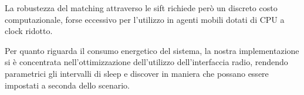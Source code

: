 La robustezza del matching attraverso le sift richiede per\`o un
discreto costo computazionale, forse eccessivo per l'utilizzo in
agenti mobili dotati di CPU a clock ridotto.

Per quanto riguarda il consumo energetico del sistema, la nostra
implementazione si \`e concentrata nell'ottimizzazione dell'utilizzo
dell'interfaccia radio, rendendo parametrici gli intervalli di sleep e
discover in maniera che possano essere impostati a seconda dello
scenario.
